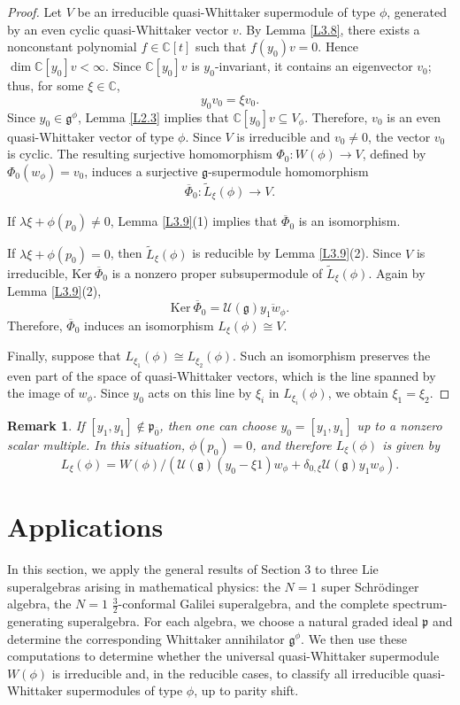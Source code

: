 \documentclass[12pt,reqno]{article}
\newtheorem{rem}{Remark}
\def\o{\overline}
\def\la{\lambda}
\def\F{\mathfrak}
\def\r{\mathrm}
\def\C{\mathcal}
\def\CC{\mathbb{C}}
\def\beqn{\begin{equation*}}
\def\eeqn{\end{equation*}}
\def\beq{\begin{equation}}
\def\eeq{\end{equation}}
\def\({\left(}
\def\){\right)}
\begin{document}
\begin{proof}
Let $V$ be an irreducible quasi-Whittaker supermodule of type $\phi$, generated by an even cyclic quasi-Whittaker vector $v$. By Lemma \ref{L3.8}, there exists a nonconstant polynomial $f\in\CC[t]$ such that $f(y_0)v=0$. Hence $\dim\CC[y_0]v<\infty$. Since $\CC[y_0]v$ is $y_0$-invariant, it contains an eigenvector $v_0$; thus, for some $\xi\in\CC$,
\beqn
y_0v_0=\xi v_0.
\eeqn
Since $y_0\in\F{g}^\phi$, Lemma \ref{L2.3} implies that $\CC[y_0]v\subseteq V_\phi$. Therefore, $v_0$ is an even quasi-Whittaker vector of type $\phi$. Since $V$ is irreducible and $v_0\neq0$, the vector $v_0$ is cyclic. The resulting surjective homomorphism $\Phi_0\colon W(\phi)\rightarrow V$, defined by $\Phi_0(w_\phi)=v_0$, induces a surjective $\F{g}$-supermodule homomorphism
\beqn
\o{\Phi}_0\colon\widetilde{L}_\xi(\phi)\rightarrow V.
\eeqn

If $\la\xi+\phi(p_0)\neq0$, Lemma \ref{L3.9}(1) implies that $\o{\Phi}_0$ is an isomorphism.

If $\la\xi+\phi(p_0)=0$, then $\widetilde{L}_\xi(\phi)$ is reducible by Lemma \ref{L3.9}(2). Since $V$ is irreducible, $\r{Ker}~\o{\Phi}_0$ is a nonzero proper subsupermodule of $\widetilde{L}_\xi(\phi)$. Again by Lemma \ref{L3.9}(2),
\beqn
\r{Ker}~\o{\Phi}_0=\C{U}(\F{g})\o{y_1w_\phi}.
\eeqn
Therefore, $\o{\Phi}_0$ induces an isomorphism $L_\xi(\phi)\cong V$.

Finally, suppose that $L_{\xi_1}(\phi)\cong L_{\xi_2}(\phi)$. Such an isomorphism preserves the even part of the space of quasi-Whittaker vectors, which is the line spanned by the image of $w_\phi$. Since $y_0$ acts on this line by $\xi_i$ in $L_{\xi_i}(\phi)$, we obtain $\xi_1=\xi_2$.
\end{proof}

\begin{rem}
	If $[y_1,y_1]\notin \F{p}_{\o{0}}$, then one can choose $y_0=[y_1,y_1]$ up to a nonzero scalar multiple. In this situation, $\phi(p_0)=0$, and therefore $L_\xi(\phi)$ is given by
	\beq\label{F10}
	L_\xi(\phi)= W(\phi)\big/\(\C{U}(\F{g})(y_0-\xi1)w_\phi+\delta_{0,\xi}\C{U}(\F{g})y_1w_\phi\).
	\eeq
\end{rem}

\section{Applications}


In this section, we apply the general results of Section 3 to three Lie superalgebras arising in mathematical physics: the $N=1$ super Schrödinger algebra, the $N=1$ $\frac{3}{2}$-conformal Galilei superalgebra, and the complete spectrum-generating superalgebra. For each algebra, we choose a natural graded ideal $\F{p}$ and determine the corresponding Whittaker annihilator $\F{g}^\phi$. We then use these computations to determine whether the universal quasi-Whittaker supermodule $W(\phi)$ is irreducible and, in the reducible cases, to classify all irreducible quasi-Whittaker supermodules of type $\phi$, up to parity shift.
\end{document}
